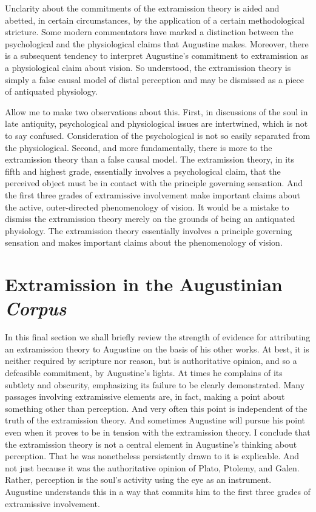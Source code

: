 \documentclass[12pt]{article}
\begin{document}
Unclarity about the commitments of the extramission theory is aided and abetted, in certain circumstances, by the application of a certain methodological stricture. Some modern commentators have marked a distinction between the psychological and the physiological claims that Augustine makes. Moreover, there is a subsequent tendency to interpret Augustine's commitment to extramission as a physiological claim about vision. So understood, the extramission theory is simply a false causal model of distal perception and may be dismissed as a piece of antiquated physiology.

Allow me to make two observations about this. First, in discussions of the soul in late antiquity, psychological and physiological issues are intertwined, which is not to say confused. Consideration of the psychological is not so easily separated from the physiological. Second, and more fundamentally, there is more to the extramission theory than a false causal model. The extramission theory, in its fifth and highest grade, essentially involves a psychological claim, that the perceived object must be in contact with the principle governing sensation. And the first three grades of extramissive involvement make important claims about the active, outer-directed phenomenology of vision. It would be a mistake to dismiss the extramission theory merely on the grounds of being an antiquated physiology. The extramission theory essentially involves a principle governing sensation and makes important claims about the phenomenology of vision.



\section{Extramission in the Augustinian \emph{Corpus}} %
\label{sec:extramission_in_the_augustinian_emph_corpus}

In this final section we shall briefly review the strength of evidence for attributing an extramission theory to Augustine on the basis of his other works. At best, it is neither required by scripture nor reason, but is authoritative opinion, and so a defeasible commitment, by Augustine's lights. At times he complains of its subtlety and obscurity, emphasizing its failure to be clearly demonstrated. Many passages involving extramissive elements are, in fact, making a point about something other than perception. And very often this point is independent of the truth of the extramission theory. And sometimes Augustine will pursue his point even when it proves to be in tension with the extramission theory. I conclude that the extramission theory is not a central element in Augustine's thinking about perception. That he was nonetheless persistently drawn to it is explicable. And not just because it was the authoritative opinion of Plato, Ptolemy, and Galen. Rather, perception is the soul's activity using the eye as an instrument. Augustine understands this in a way that commits him to the first three grades of extramissive involvement. 
\end{document}
